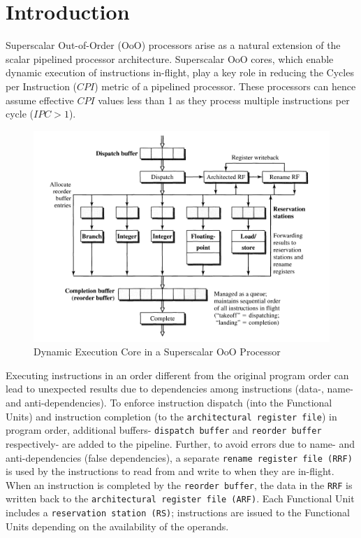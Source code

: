\documentclass[12pt,a4paper,english]{paper}
\begin{document}
\section{Introduction}
Superscalar Out-of-Order (OoO) processors arise as a natural extension of the scalar pipelined processor architecture. Superscalar OoO cores, which enable dynamic execution of instructions in-flight, play a key role in reducing the Cycles per Instruction ($CPI$) metric of a pipelined processor. These processors can hence assume effective $CPI$ values less than 1 as they process multiple instructions per cycle ($IPC > 1$).
\begin{figure}[H]
    \centering
    \includegraphics[scale=0.7]{DynExecCore.png}
    \caption{Dynamic Execution Core in a Superscalar OoO Processor \cite{shen_modern_2013}}
    \label{fig:hierarchy}
\end{figure}

Executing instructions in an order different from the original program order can lead to unexpected results due to dependencies among instructions (data-, name- and anti-dependencies). To enforce instruction dispatch (into the Functional Units) and instruction completion (to the \texttt{architectural register file}) in program order, additional buffers- \texttt{dispatch buffer} and \texttt{reorder buffer} respectively- are added to the pipeline. Further, to avoid errors due to name- and anti-dependencies (false dependencies), a separate \texttt{rename register file (RRF)} is used by the instructions to read from and write to when they are in-flight. When an instruction is completed by the \texttt{reorder buffer}, the data in the \texttt{RRF} is written back to the \texttt{architectural register file (ARF)}. Each Functional Unit includes a \texttt{reservation station (RS)}; instructions are issued to the Functional Units depending on the availability of the operands. 
\end{document}
